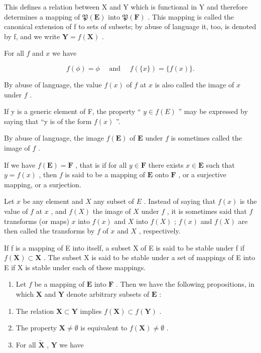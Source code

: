 This defines a relation between X and Y which is functional in Y and therefore determines a mapping of \(\mathfrak{P}(\mathbf{E})\) into \(\mathfrak{P}(\mathbf{F})\) . This mapping is called the canonical extension of f to sets of subsets; by abuse of language it, too, is denoted by f, and we write \(\mathbf{Y}=f(\mathbf{X})\) .

For all \(f\) and \(x\) we have

\[
f (\phi) = \phi \quad \text { and } \quad f (\{x \}) = \{f (x) \}.
\]

By abuse of language, the value \(f(x)\) of \(f\) at \(x\) is also called the image of \(x\) under \(f\) .

If y is a generic element of F, the property `` \(y \in f(E)\) '' may be expressed by saying that ``y is of the form \(f(x)\) ''.

By abuse of language, the image \(f(\mathbf{E})\) of \(\mathbf{E}\) under \(f\) is sometimes called the image of \(f\) .

If we have \(f(\mathbf{E}) = \mathbf{F}\) , that is if for all \(y \in \mathbf{F}\) there exists \(x \in \mathbf{E}\) such that \(y = f(x)\) , then \(f\) is said to be a mapping of \(\mathbf{E}\) onto \(\mathbf{F}\) , or a surjective mapping, or a surjection.

Let \(x\) be any element and \(X\) any subset of \(E\) . Instead of saying that \(f(x)\) is the value of \(f\) at \(x\) , and \(f(X)\) the image of \(X\) under \(f\) , it is sometimes said that \(f\) transforms (or maps) \(x\) into \(f(x)\) and \(X\) into \(f(X)\) ; \(f(x)\) and \(f(X)\) are then called the transforms by \(f\) of \(x\) and \(X\) , respectively.

If f is a mapping of E into itself, a subset X of E is said to be stable under f if \(f(\mathbf{X}) \subset \mathbf{X}\) . The subset X is said to be stable under a set of mappings of E into E if X is stable under each of these mappings.

\begin{enumerate}
\def\labelenumi{\arabic{enumi}.}
\setcounter{enumi}{4}
\tightlist
\item
  Let \(f\) be a mapping of \(\mathbf{E}\) into \(\mathbf{F}\) . Then we have the following propositions, in which \(\mathbf{X}\) and \(\mathbf{Y}\) denote arbitrary subsets of \(\mathbf{E}\) :
\end{enumerate}

\begin{enumerate}
\def\labelenumi{(\alph{enumi})}
\item
  The relation \(\mathbf{X} \subset \mathbf{Y}\) implies \(f(\mathbf{X}) \subset f(\mathbf{Y})\) .
\item
  The property \(\mathbf{X} \neq \emptyset\) is equivalent to \(f(\mathbf{X}) \neq \emptyset\) .
\item
  For all \(\tilde{\mathbf{X}}\) , \(\mathbf{Y}\) we have
\end{enumerate}

